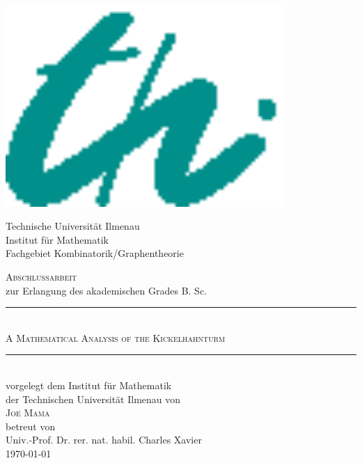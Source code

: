 \begin{titlepage}
\enlargethispage{\baselineskip} 
\large
\hspace{0.2cm}
\begin{minipage}{3.5cm}
\includegraphics[width=0.8\textwidth]{./Appearance/Logo2.eps}
\end{minipage}
\begin{minipage}{11cm}
\vspace{0.8cm}
\small
{Technische Universit\"at Ilmenau\\}
Institut f\"ur Mathematik\\
Fachgebiet Kombinatorik/Graphentheorie\\
\end{minipage}
\begin{center}
\vspace{.5cm}
{\huge \scshape Abschlussarbeit}\\
\vspace{0.4cm}
{\large zur Erlangung des akademischen Grades B. Sc.}\\
\vspace{1.2cm}
\rule{\linewidth}{0.2pt}\\
\vspace{0.8cm} {\Huge \scshape A Mathematical Analysis of the Kickelhahnturm\\}
\vspace{0.8cm}
\rule{\linewidth}{0.2pt}\\
\vspace{1.2cm}
{\small vorgelegt dem Institut für Mathematik\\
der Technischen Universität Ilmenau von\\}
\vspace{0.4cm}
{\Large \scshape Joe Mama}\\
\vspace{0.6cm}
{\small betreut von\\}
\vspace{0.2cm}
{\large Univ.-Prof. Dr. rer. nat. habil. Charles Xavier}\\
\vspace{0.6cm}
\today
\end{center}
\end{titlepage}